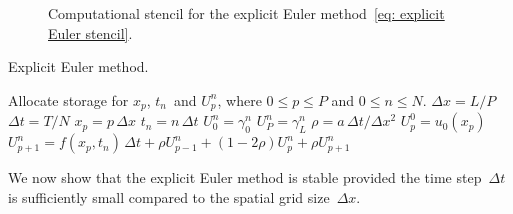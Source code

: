 \begin{figure}
\caption{Computational stencil for the explicit Euler 
method~\eqref{eq: explicit Euler stencil}.}
\label{fig: explicit Euler stencil}
\begin{center}
\end{center}
\end{figure}

\begin{algorithm}
\caption{Explicit Euler method.}
\label{alg: explicit Euler}
\begin{algorithmic}
\State Allocate storage for $x_p$, $t_n$~and $U^n_p$, where $0\le p\le P$ and 
$0\le n\le N$.
\State $\Delta x=L/P$ 
\State$\Delta t=T/N$
    \State $x_p=p\,\Delta x$
\EndFor
{}
    \State $t_n=n\,\Delta t$
    \State $U^n_0=\gamma_0^n$
    \State $U^n_P=\gamma_L^n$
\EndFor
\State $\rho=a\,\Delta t/\Delta x^2$
    \State $U^0_p=u_0(x_p)$
\EndFor
{}
    \State $U^n_{p+1}=f(x_p,t_n)\,\Delta t
            +\rho U^n_{p-1}+(1-2\rho)U^n_p+\rho U^n_{p+1}$
\EndFor
\end{algorithmic}
\end{algorithm}

We now show that the explicit Euler method is stable provided the time 
step~$\Delta t$ is sufficiently small compared to the spatial grid 
size~$\Delta x$.

